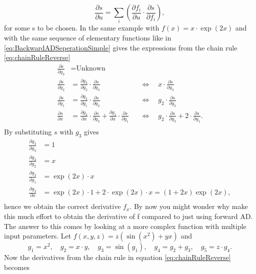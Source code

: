 \begin{equation}
    \label{eq:chainRuleReverse}
    \frac{\partial s}{\partial u} = \sum_i\left(\frac{\partial f_i}{\partial u}\cdot\frac{\partial s}{\partial f_i}\right),
\end{equation}
for some s to be chosen. In the same example with $f(x) = x\cdot\exp(2x)$ and with the same sequence of elementary functions like in \eqref{eq:BackwardADSeperationSimple} gives the expressions from the chain rule \eqref{eq:chainRuleReverse}
\begin{align*}
    \frac{\partial s}{\partial g_3} &= \text{Unknown}\\
    \frac{\partial s}{\partial g_2} &= \frac{\partial g_3}{\partial g_2} \cdot \frac{\partial s}{\partial g_3} &&\Longleftrightarrow \quad x\cdot \frac{\partial s}{\partial g_3} \\
    \frac{\partial s}{\partial g_1} &= \frac{\partial g_2}{\partial g_1}\cdot \frac{\partial s}{\partial g_2} &&\Longleftrightarrow \quad g_2 \cdot \frac{\partial s}{\partial g_2} \\
    \frac{\partial s}{\partial x} &= \frac{\partial g_3}{\partial x}\cdot \frac{\partial s}{\partial g_3} + \frac{\partial g_1}{\partial x}\cdot \frac{\partial s}{\partial g_1} && \Longleftrightarrow \quad g_2\cdot \frac{\partial s}{\partial g_3} + 2\cdot \frac{\partial s}{\partial g_1}.\\
\end{align*}
By substituting $s$ with $g_3$ gives
\begin{align*}
    \frac{\partial g_3}{\partial g_3} &= 1\\
    \frac{\partial g_3}{\partial g_2} &= x\\
    \frac{\partial g_3}{\partial g_1} &= \exp(2x)\cdot x\\
    \frac{\partial g_3}{\partial x} &= \exp(2x)\cdot 1 + 2\cdot\exp(2x)\cdot x = (1 + 2x)\exp(2x),\\
\end{align*}
hence we obtain the correct derivative $f_x$. By now you might wonder why make this much effort to obtain the derivative of f compared to just using forward AD. The answer to this comes by looking at a more complex function with multiple input parameters. Let $f(x,y,z) = z(\sin(x^2)+yx)$ and 
\begin{equation*}
    g_1 = x^2, \quad g_2 = x\cdot y, \quad g_3 = \sin(g_1), \quad g_4 = g_2 + g_3, \quad g_5 = z\cdot g_4.
\end{equation*}
Now the derivatives from the chain rule in equation \eqref{eq:chainRuleReverse} becomes \\
